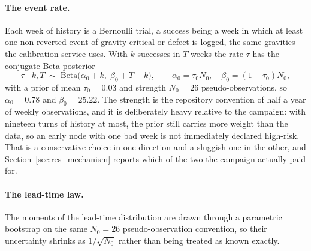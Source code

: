 \paragraph{The event rate.}
Each week of history is a Bernoulli trial, a success being a week in which at least one
non-reverted event of gravity critical or defect is logged, the same gravities the
calibration service uses. With $k$ successes in $T$ weeks the rate $\tau$ has the conjugate
Beta posterior
\begin{equation}
    \tau \mid k, T \;\sim\; \mathrm{Beta}\bigl(\alpha_0 + k,\; \beta_0 + T - k\bigr),
    \qquad
    \alpha_0 = \tau_0 N_0, \quad \beta_0 = (1-\tau_0) N_0,
    \label{eq:beta_posterior}
\end{equation}
with a prior of mean $\tau_0 = 0.03$ and strength $N_0 = 26$ pseudo-observations, so
$\alpha_0 = 0.78$ and $\beta_0 = 25.22$. The strength is the repository convention of half a
year of weekly observations, and it is deliberately heavy relative to the campaign: with
nineteen turns of history at most, the prior still carries more weight than the data, so an
early node with one bad week is not immediately declared high-risk. That is a conservative
choice in one direction and a sluggish one in the other, and Section~\ref{sec:res_mechanism}
reports which of the two the campaign actually paid for.

\paragraph{The lead-time law.}
The moments of the lead-time distribution are drawn through a parametric bootstrap on the
same $N_0 = 26$ pseudo-observation convention, so their uncertainty shrinks as
$1/\sqrt{N_0}$ rather than being treated as known exactly.

